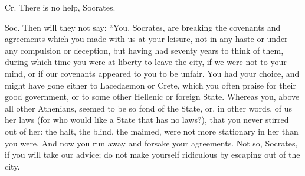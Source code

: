 Cr. There is no help, Socrates. 

Soc. Then will they not say: ``You, Socrates, are breaking the covenants
and agreements which you made with us at your leisure, not in any
haste or under any compulsion or deception, but having had seventy
years to think of them, during which time you were at liberty to leave
the city, if we were not to your mind, or if our covenants appeared
to you to be unfair. You had your choice, and might have gone either
to Lacedaemon or Crete, which you often praise for their good government,
or to some other Hellenic or foreign State. Whereas you, above all
other Athenians, seemed to be so fond of the State, or, in other words,
of us her laws (for who would like a State that has no laws?), that
you never stirred out of her: the halt, the blind, the maimed, were
not more stationary in her than you were. And now you run away and
forsake your agreements. Not so, Socrates, if you will take our advice;
do not make yourself ridiculous by escaping out of the city.

